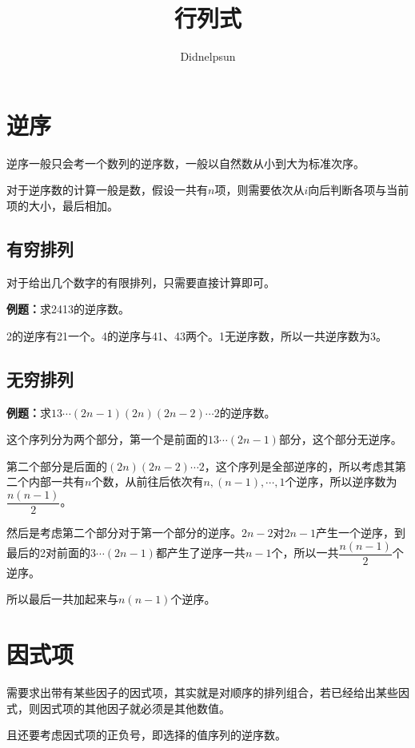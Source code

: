 \documentclass[UTF8, 12pt]{ctexart}
\author{Didnelpsun}
\title{行列式}
\date{}
\begin{document}
\maketitle
\pagestyle{empty}
\thispagestyle{empty}
\tableofcontents
\thispagestyle{empty}
\newpage
\pagestyle{plain}
\setcounter{page}{1}
\section{逆序}

逆序一般只会考一个数列的逆序数，一般以自然数从小到大为标准次序。

对于逆序数的计算一般是数，假设一共有$n$项，则需要依次从$i$向后判断各项与当前项的大小，最后相加。

\subsection{有穷排列}

对于给出几个数字的有限排列，只需要直接计算即可。

\textbf{例题：}求2413的逆序数。

2的逆序有21一个。4的逆序与41、43两个。1无逆序数，所以一共逆序数为3。

\subsection{无穷排列}

\textbf{例题：}求$13\cdots(2n-1)(2n)(2n-2)\cdots2$的逆序数。

这个序列分为两个部分，第一个是前面的$13\cdots(2n-1)$部分，这个部分无逆序。

第二个部分是后面的$(2n)(2n-2)\cdots2$，这个序列是全部逆序的，所以考虑其第二个内部一共有$n$个数，从前往后依次有$n,(n-1),\cdots,1$个逆序，所以逆序数为$\dfrac{n(n-1)}{2}$。

然后是考虑第二个部分对于第一个部分的逆序。$2n-2$对$2n-1$产生一个逆序，到最后的2对前面的$3\cdots(2n-1)$都产生了逆序一共$n-1$个，所以一共$\dfrac{n(n-1)}{2}$个逆序。

所以最后一共加起来与$n(n-1)$个逆序。

\section{因式项}

需要求出带有某些因子的因式项，其实就是对顺序的排列组合，若已经给出某些因式，则因式项的其他因子就必须是其他数值。

且还要考虑因式项的正负号，即选择的值序列的逆序数。
\end{document}
